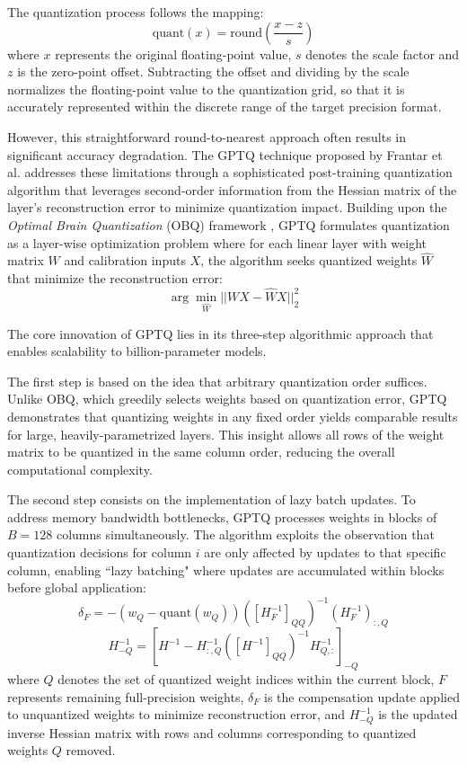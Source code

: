 The quantization process follows the mapping:
\begin{equation}
\text{quant}(x) = \text{round}\left(\frac{x - z}{s}\right)
\end{equation}
where $x$ represents the original floating-point value, $s$ denotes the scale factor and $z$ is the zero-point offset. Subtracting the offset and dividing by the scale normalizes the floating-point value to the quantization grid, so that it is accurately represented within the discrete range of the target precision format.

However, this straightforward round-to-nearest approach often results in significant accuracy degradation. The GPTQ technique proposed by Frantar et al. \cite{gptq_quantization} addresses these limitations through a sophisticated post-training quantization algorithm that leverages second-order information from the Hessian matrix of the layer's reconstruction error to minimize quantization impact. Building upon the \textit{Optimal Brain Quantization} (OBQ) framework \cite{obq}, GPTQ formulates quantization as a layer-wise optimization problem where for each linear layer with weight matrix $W$ and calibration inputs $X$, the algorithm seeks quantized weights $\hat{W}$ that minimize the reconstruction error:
\begin{equation}
\arg\min_{\hat{W}} ||WX - \hat{W}X||_2^2
\end{equation}

The core innovation of GPTQ lies in its three-step algorithmic approach that enables scalability to billion-parameter models.

The first step is based on the idea that arbitrary quantization order suffices. Unlike OBQ, which greedily selects weights based on quantization error, GPTQ demonstrates that quantizing weights in any fixed order yields comparable results for large, heavily-parametrized layers. This insight allows all rows of the weight matrix to be quantized in the same column order, reducing the overall computational complexity.

The second step consists on the implementation of lazy batch updates. To address memory bandwidth bottlenecks, GPTQ processes weights in blocks of $B=128$ columns simultaneously. The algorithm exploits the observation that quantization decisions for column $i$ are only affected by updates to that specific column, enabling ``lazy batching" where updates are accumulated within blocks before global application:
\begin{equation}
\delta_F = -(w_Q - \text{quant}(w_Q))([H_F^{-1}]_{QQ})^{-1}(H_F^{-1})_{:,Q}
\end{equation}
\begin{equation}
H_{-Q}^{-1} = \left[H^{-1} - H_{:,Q}^{-1}([H^{-1}]_{QQ})^{-1}H_{Q,:}^{-1}\right]_{-Q}
\end{equation}
where $Q$ denotes the set of quantized weight indices within the current block, $F$ represents remaining full-precision weights, $\delta_F$ is the compensation update applied to unquantized weights to minimize reconstruction error, and $H_{-Q}^{-1}$ is the updated inverse Hessian matrix with rows and columns corresponding to quantized weights $Q$ removed.

